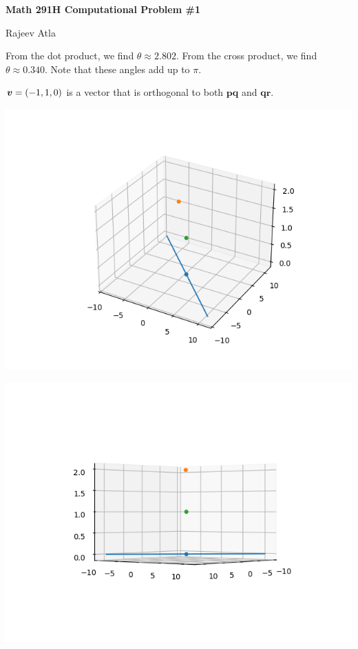 \documentclass{article}
\begin{document}
\begin{center}
    \Large \textbf{Math 291H Computational Problem \#1}
\end{center}
  
\begin{center}
    \Large Rajeev Atla
\end{center}







From the dot product, we find $\theta \approx 2.802$.
From the cross product, we find $\theta \approx 0.340$.
Note that these angles add up to $\pi$.



$\bm{v} = \left ( -1, 1, 0 \right)$ is a vector that is orthogonal to both $\bm{pq}$ and $\bm{qr}$.



\includegraphics{fig1.png}

\includegraphics{fig2.png}
\end{document}
